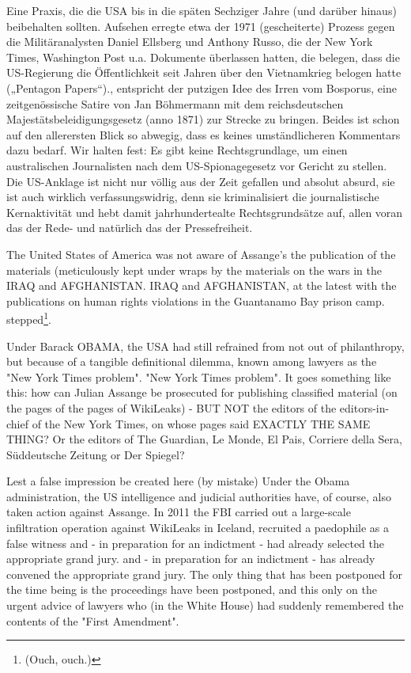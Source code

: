 \begin{multicols}{2}
{{Eine Praxis, die die USA bis in die späten Sechziger Jahre (und darüber hinaus) beibehalten sollten. Aufsehen erregte etwa der 1971 (gescheiterte) Prozess gegen die Militäranalysten Daniel Ellsberg und Anthony Russo, die der New York Times, Washington Post u.a. Dokumente überlassen hatten, die belegen, dass die US-Regierung die Öffentlichkeit seit
Jahren über den Vietnamkrieg belogen hatte („Pentagon Papers“).}, entspricht der putzigen Idee des Irren vom Bosporus, eine zeitgenössische Satire von Jan Böhmermann
mit dem reichsdeutschen Majestätsbeleidigungsgesetz
(anno 1871) zur Strecke zu bringen. Beides ist schon
auf den allerersten Blick so abwegig, dass es keines umständlicheren Kommentars dazu bedarf. Wir halten fest:
Es gibt keine Rechtsgrundlage, um einen australischen
Journalisten nach dem US-Spionagegesetz vor Gericht
zu stellen.
\textCR
Die US-Anklage ist nicht nur völlig aus der Zeit gefallen
und absolut absurd, sie ist auch wirklich verfassungswidrig, denn sie kriminalisiert die 
journalistische Kernaktivität und hebt damit jahrhundertealte Rechtsgrundsätze auf, allen voran das der Rede- und natürlich das
der Pressefreiheit.}

The United States of America was not aware of Assange's
the publication of the materials (meticulously kept under wraps by the
materials on the wars in the IRAQ and AFGHANISTAN.
IRAQ and AFGHANISTAN, at the latest with the publications on human rights violations in the Guantanamo Bay prison camp.
stepped\footnote[4]{(Ouch, ouch.)}.

Under Barack OBAMA, the USA had still refrained from
not out of philanthropy, but because of a tangible definitional dilemma, known among lawyers as the "New York Times problem".
"New York Times problem". It goes something like this: how can Julian Assange be prosecuted for publishing classified material (on the pages of
the pages of WikiLeaks) - BUT NOT the editors of the
editors-in-chief of the New York Times, on whose pages
said EXACTLY THE SAME THING? Or the editors
of The Guardian, Le Monde, El Pais, Corriere della Sera,
Süddeutsche Zeitung or Der Spiegel?

Lest a false impression be created here (by mistake)
Under the Obama administration, the US intelligence and judicial authorities have, of course, also taken action against Assange. In 2011 the
FBI carried out a large-scale infiltration operation against WikiLeaks in Iceland, recruited a paedophile as a false witness and - in preparation for an indictment - had already selected the appropriate grand jury.
and - in preparation for an indictment - has already convened the appropriate grand jury.
The only thing that has been postponed for the time being is the
proceedings have been postponed, and this only on the urgent advice
of lawyers who (in the White House) had suddenly remembered the contents of the "First Amendment".


\end{multicols}
